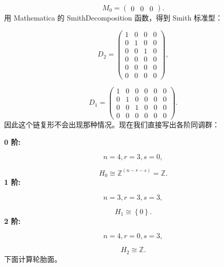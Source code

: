 \documentclass[UTF8]{ctexart}
\begin{document}
\begin{equation}
M_{0}=\left(\begin{array}{ccc}
0 & 0 & 0\end{array}\right).
\end{equation}
用 Mathematica 的 SmithDecomposition 函数，得到 Smith 标准型：

\begin{equation}
D_{2}=\left(\begin{array}{cccc}
1 & 0 & 0 & 0\\
0 & 1 & 0 & 0\\
0 & 0 & 1 & 0\\
0 & 0 & 0 & 0\\
0 & 0 & 0 & 0\\
0 & 0 & 0 & 0
\end{array}\right),
\end{equation}

\begin{equation}
D_{1}=\left(\begin{array}{cccccc}
1 & 0 & 0 & 0 & 0 & 0\\
0 & 1 & 0 & 0 & 0 & 0\\
0 & 0 & 1 & 0 & 0 & 0\\
0 & 0 & 0 & 0 & 0 & 0
\end{array}\right).
\end{equation}
因此这个链复形不会出现那种情况。现在我们直接写出各阶同调群：

\noindent
\textbf{0 阶:}

\begin{equation}
n=4,r=3,s=0,
\end{equation}

\begin{equation}
H_{0}\cong\mathbb{Z}^{(n-r-s)}=\mathbb{Z}.
\end{equation}
\textbf{1 阶:}

\begin{equation}
n=3,r=3,s=3,
\end{equation}

\begin{equation}
H_{1}\cong\left\{ 0\right\} .
\end{equation}
\textbf{2 阶:}

\begin{equation}
n=4,r=0,s=3,
\end{equation}

\begin{equation}
H_{2}\cong\mathbb{Z}.
\end{equation}
下面计算轮胎面。
\end{document}
